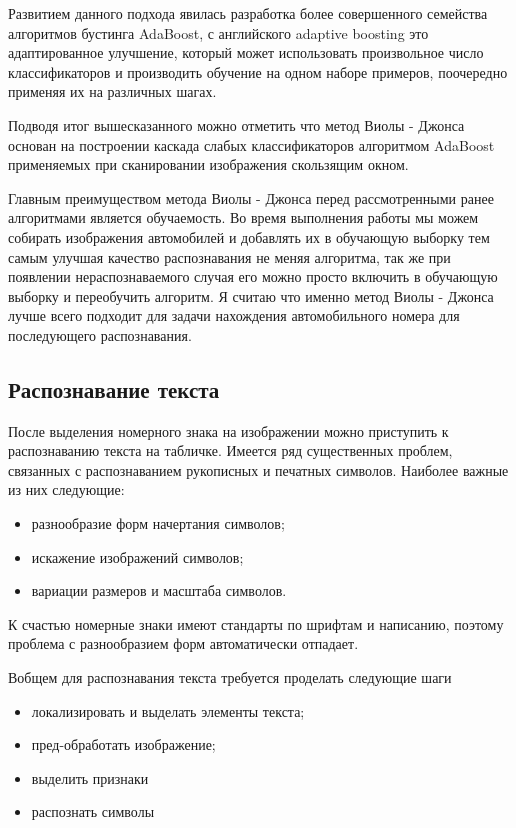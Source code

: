 Развитием данного подхода явилась разработка более совершенного семейства алгоритмов бустинга AdaBoost, с английского adaptive boosting это адаптированное улучшение, который может использовать произвольное число классификаторов и производить обучение на одном наборе примеров, поочередно применяя их на различных шагах.

Подводя итог вышесказанного можно отметить что метод Виолы - Джонса основан на построении каскада слабых классификаторов алгоритмом AdaBoost применяемых при сканировании изображения скользящим окном.

Главным преимуществом метода Виолы - Джонса перед рассмотренными ранее алгоритмами является обучаемость. Во время выполнения работы мы можем собирать изображения автомобилей и добавлять их в обучающую выборку тем самым улучшая качество распознавания не меняя алгоритма, так же при появлении нераспознаваемого случая его можно просто включить в обучающую выборку и переобучить алгоритм. Я считаю что именно метод Виолы - Джонса лучше всего подходит для задачи нахождения автомобильного номера для последующего распознавания.

\subsection{Распознавание текста}
\label{sub:domain:recognition}

После выделения номерного знака на изображении можно приступить к распознаванию текста на табличке. 
Имеется ряд существенных проблем, связанных с распознаванием рукописных и печатных символов. Наиболее важные из них следующие:
\begin{itemize}
  \item разнообразие форм начертания символов;
  \item искажение изображений символов;
  \item вариации размеров и масштаба символов.
\end{itemize}
К счастью номерные знаки имеют стандарты по шрифтам и написанию, поэтому проблема с разнообразием форм автоматически отпадает.

Вобщем для распознавания текста требуется проделать следующие шаги
\begin{itemize}
  \item локализировать и выделать элементы текста;
  \item пред-обработать изображение;
  \item выделить признаки
  \item распознать символы
\end{itemize}

